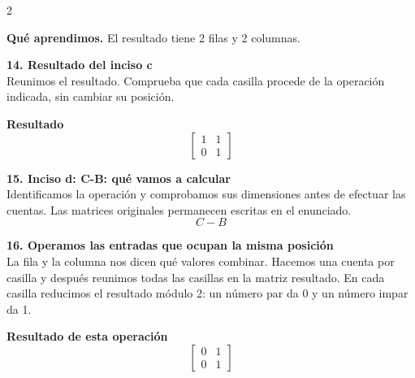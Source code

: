 \documentclass[11pt,a4paper,landscape]{article}
\begin{document}
\begin{multicols*}{2}
\begin{minipage}{\linewidth}
\par\smallskip\textbf{Qué aprendimos.} El resultado tiene 2 filas y 2 columnas.
\end{minipage}\par\medskip
\noindent\begin{minipage}{\linewidth}\textbf{14. Resultado del inciso c}\\[2pt]Reunimos el resultado. Comprueba que cada casilla procede de la operación indicada, sin cambiar su posición.
\par\smallskip \textbf{Resultado}\[\begin{bmatrix}1 & 1\\0 & 1\end{bmatrix}\]
\end{minipage}\par\medskip
\noindent\begin{minipage}{\linewidth}\textbf{15. Inciso d: C-B: qué vamos a calcular}\\[2pt]Identificamos la operación y comprobamos sus dimensiones antes de efectuar las cuentas. Las matrices originales permanecen escritas en el enunciado.
\[C-B\]
\end{minipage}\par\medskip
\noindent\begin{minipage}{\linewidth}\textbf{16. Operamos las entradas que ocupan la misma posición}\\[2pt]La fila y la columna nos dicen qué valores combinar. Hacemos una cuenta por casilla y después reunimos todas las casillas en la matriz resultado. En cada casilla reducimos el resultado módulo 2: un número par da 0 y un número impar da 1.
\par{}\par\smallskip
\par\smallskip \textbf{Resultado de esta operación}\[\begin{bmatrix}0 & 1\\0 & 1\end{bmatrix}\]

\end{minipage}
\end{multicols*}
\end{document}
